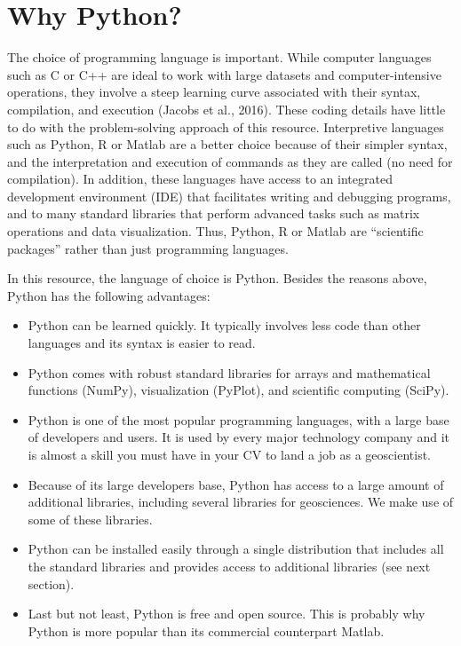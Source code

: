 \documentclass[a4paper , 12pt]{book}
\begin{document}
\section{Why Python?}

The choice of programming language is important. While computer languages such as C or C++ are ideal to work with large datasets and computer-intensive operations, they involve a steep learning curve associated with their syntax, compilation, and execution (Jacobs et al., 2016). These coding details have little to do with the problem-solving approach of this resource. Interpretive languages such as Python, R or Matlab are a better choice because of their simpler syntax, and the interpretation and execution of commands as they are called (no need for compilation). In addition, these languages have access to an integrated development environment (IDE) that facilitates writing and debugging programs, and to many standard libraries that perform advanced tasks such as matrix operations and data visualization. Thus, Python, R or Matlab are “scientific packages” rather than just programming languages.

In this resource, the language of choice is Python. Besides the reasons above, Python has the following advantages:
\begin{itemize}
  \item Python can be learned quickly. It typically involves less code than other languages and its syntax is easier to read.
  \item Python comes with robust standard libraries for arrays and mathematical functions (NumPy), visualization (PyPlot), and scientific computing (SciPy).
  \item Python is one of the most popular programming languages, with a large base of developers and users. It is used by every major technology company and it is almost a skill you must have in your CV to land a job as a geoscientist.
  \item Because of its large developers base, Python has access to a large amount of additional libraries, including several libraries for geosciences. We make use of some of these libraries.
  \item Python can be installed easily through a single distribution that includes all the standard libraries and provides access to additional libraries (see next section).
  \item Last but not least, Python is free and open source. This is probably why Python is more popular than its commercial counterpart Matlab.
\end{itemize}
\end{document}
